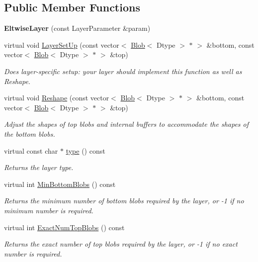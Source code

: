 \subsection*{Public Member Functions}
\begin{DoxyCompactItemize}
\item 
{\bfseries Eltwise\+Layer} (const Layer\+Parameter \&param)\hypertarget{classcaffe_1_1EltwiseLayer_a896ae6914a6358a90e3e67621a6fe082}{}\label{classcaffe_1_1EltwiseLayer_a896ae6914a6358a90e3e67621a6fe082}

\item 
virtual void \hyperlink{classcaffe_1_1EltwiseLayer_af4955762e92edb355b4f724e7ffd6473}{Layer\+Set\+Up} (const vector$<$ \hyperlink{classcaffe_1_1Blob}{Blob}$<$ Dtype $>$ $\ast$ $>$ \&bottom, const vector$<$ \hyperlink{classcaffe_1_1Blob}{Blob}$<$ Dtype $>$ $\ast$ $>$ \&top)
\begin{DoxyCompactList}\small\item\em Does layer-\/specific setup\+: your layer should implement this function as well as Reshape. \end{DoxyCompactList}\item 
virtual void \hyperlink{classcaffe_1_1EltwiseLayer_af5a843a83dda78e077ec580032ffd293}{Reshape} (const vector$<$ \hyperlink{classcaffe_1_1Blob}{Blob}$<$ Dtype $>$ $\ast$ $>$ \&bottom, const vector$<$ \hyperlink{classcaffe_1_1Blob}{Blob}$<$ Dtype $>$ $\ast$ $>$ \&top)
\begin{DoxyCompactList}\small\item\em Adjust the shapes of top blobs and internal buffers to accommodate the shapes of the bottom blobs. \end{DoxyCompactList}\item 
virtual const char $\ast$ \hyperlink{classcaffe_1_1EltwiseLayer_a425afe450f5b2fd9a17a944781ed9a3c}{type} () const \hypertarget{classcaffe_1_1EltwiseLayer_a425afe450f5b2fd9a17a944781ed9a3c}{}\label{classcaffe_1_1EltwiseLayer_a425afe450f5b2fd9a17a944781ed9a3c}

\begin{DoxyCompactList}\small\item\em Returns the layer type. \end{DoxyCompactList}\item 
virtual int \hyperlink{classcaffe_1_1EltwiseLayer_a27e853f4eb0e05ce52f9a3e291d06063}{Min\+Bottom\+Blobs} () const 
\begin{DoxyCompactList}\small\item\em Returns the minimum number of bottom blobs required by the layer, or -\/1 if no minimum number is required. \end{DoxyCompactList}\item 
virtual int \hyperlink{classcaffe_1_1EltwiseLayer_adab35a7e096edeb73670e6682f264774}{Exact\+Num\+Top\+Blobs} () const 
\begin{DoxyCompactList}\small\item\em Returns the exact number of top blobs required by the layer, or -\/1 if no exact number is required. \end{DoxyCompactList}\end{DoxyCompactItemize}
